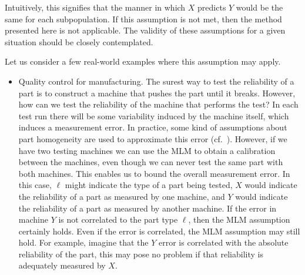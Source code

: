 Intuitively, this signifies that the manner in which $X$ predicts $Y$ would be the same for each subpopulation.  If this assumption is not met, then the method presented here is not applicable.  The validity of these assumptions for a given situation should be closely contemplated.  

Let us consider a few real-world examples where this assumption may apply.

\begin{itemize}
    \item Quality control for manufacturing.   The surest way to test the reliability of a part is to construct a machine that pushes the part until it breaks.  However, how can we test the reliability of the machine that performs the test?  In each test run there will be some variability induced by the machine itself, which induces a measurement error.  In practice, some kind of assumptions about part homogeneity are used to approximate this error (cf.\ \cite{de2005gauge}).  However, if we have two testing machines we can use the MLM to obtain a calibration between the machines, even though we can never test the same part with both machines.  This enables us to bound the overall measurement error.  In this case, $\ell$ might indicate the type of a part being tested, $X$ would indicate the reliability of a part as measured by one machine, and $Y$ would indicate the reliability of a part as measured by another machine.  If the error in machine $Y$ is not correlated to the part type $\ell$, then the MLM assumption certainly holds.  Even if the error is correlated, the MLM assumption may still hold.  For example, imagine that the $Y$ error is correlated with the absolute reliability of the part, this may pose no problem if that reliability is adequately measured by $X$.  


\end{itemize}
